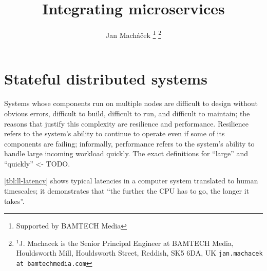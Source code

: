 \documentclass[10 pt, twocolumn]{article}
\title{Integrating microservices}
\author{Jan Mach{\'a}\v{c}ek%
\thanks{Supported by BAMTECH Media}%
\thanks{$^{1}$J. Machacek is the Senior Principal Engineer at BAMTECH Media, Houldsworth Mill, Houldsworth Street, Reddish, SK5 6DA, UK {\tt\small jan.machacek at bamtechmedia.com}}%
}
\begin{document}

\section{Stateful distributed systems}
Systems whose components run on multiple nodes are difficult to design without obvious errors, difficult to build, difficult to run, and difficult to maintain; the reasons that justify this complexity are resilience and performance. Resilience refers to the system's ability to continue to operate even if some of its components are failing; informally, performance refers to the system's ability to handle large incoming workload quickly. The exact definitions for ``large'' and ``quickly'' <- TODO.

\autoref{tbl:ll-latency}\cite{fommil-netlib} shows typical latencies in a computer system translated to human timescales; it demonstrates that ``the further the CPU has to go, the longer it takes''.
\end{document}
